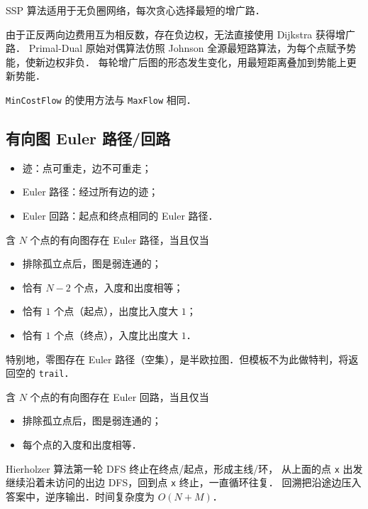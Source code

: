 SSP 算法适用于无负圈网络，每次贪心选择最短的增广路．

由于正反两向边费用互为相反数，存在负边权，无法直接使用 Dijkstra 获得增广路．
Primal-Dual 原始对偶算法仿照 Johnson 全源最短路算法，为每个点赋予势能，使新边权非负．
每轮增广后图的形态发生变化，用最短距离叠加到势能上更新势能．

{\tt MinCostFlow} 的使用方法与 {\tt MaxFlow} 相同．



\newpage

\subsection{有向图 Euler 路径/回路}

\begin{itemize}[noitemsep]
    \item 迹：点可重走，边不可重走；
    \item Euler 路径：经过所有边的迹；
    \item Euler 回路：起点和终点相同的 Euler 路径．
\end{itemize}

含 $N$ 个点的有向图存在 Euler 路径，当且仅当

\begin{itemize}[noitemsep]
    \item 排除孤立点后，图是弱连通的；
    \item 恰有 $N - 2$ 个点，入度和出度相等；
    \item 恰有 $1$ 个点（起点），出度比入度大 $1$；
    \item 恰有 $1$ 个点（终点），入度比出度大 $1$．
\end{itemize}

特别地，零图存在 Euler 路径（空集），是半欧拉图．但模板不为此做特判，将返回空的 {\tt trail}．

含 $N$ 个点的有向图存在 Euler 回路，当且仅当

\begin{itemize}[noitemsep]
    \item 排除孤立点后，图是弱连通的；
    \item 每个点的入度和出度相等．
\end{itemize}

Hierholzer 算法第一轮 DFS 终止在终点/起点，形成主线/环，
从上面的点 {\tt x} 出发继续沿着未访问的出边 DFS，回到点 {\tt x} 终止，一直循环往复．
回溯把沿途边压入答案中，逆序输出．时间复杂度为 $O(N + M)$．

